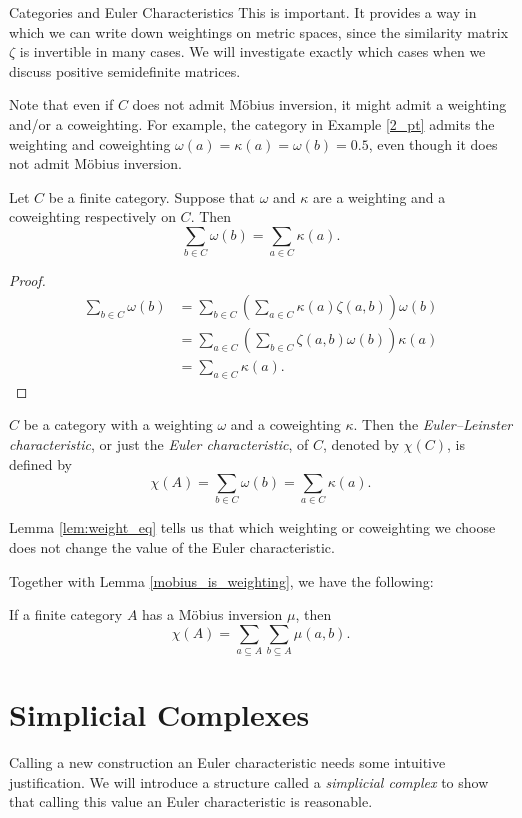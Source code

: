 \documentclass[12pt]{pom_thesis}
\begin{document}
\begin{chapter}{Categories and Euler Characteristics}
This is important. It provides a way in which we can write down weightings on metric spaces, since the similarity matrix $\zeta$ is invertible in many cases. We will investigate exactly which cases when we discuss positive semidefinite matrices.

Note that even if $C$ does not admit M\"obius inversion, it might admit a weighting and/or a coweighting. For example, the category in Example \ref{2_pt} admits the weighting and coweighting $\omega(a) =\kappa(a)= \omega(b) = 0.5$, even though it does not admit M\"obius inversion.

\begin{lemma}\label{lem:weight_eq}
Let $C$ be a finite category. Suppose that $\omega$ and $\kappa$ are a weighting and a coweighting respectively on $C$. Then 
\[\sum_{b \in C} \omega(b) = \sum_{a \in C} \kappa(a).
\]
\end{lemma}
\begin{proof}
\begin{align*}
\sum_{b \in C} \omega(b) &= \sum_{b \in C}\left( \sum_{a \in C} \kappa(a)\zeta(a,b)\right)\omega(b) \\
&= \sum_{a \in C}\left(\sum_{b \in C} \zeta(a,b)\omega(b)\right)  \kappa(a) \\
&= \sum_{a \in C}\kappa(a).
\end{align*}
\end{proof}

\begin{defn}\label{cat_euler}
$C$ be a category with a weighting $\omega$ and a coweighting $\kappa$. Then the \emph{Euler--Leinster characteristic}, or just the \emph{Euler characteristic}, of $C$, denoted by $\chi(C)$, is defined by
\[
\chi(A) = \sum_{b \in C} \omega(b) = \sum_{a \in C} \kappa(a).
\]
\end{defn}
Lemma \ref{lem:weight_eq} tells us that which weighting or coweighting we choose does not change the value of the Euler characteristic.

Together with Lemma \ref{mobius_is_weighting}, we have the following:
\begin{cor}\label{euler_mu}
If a finite category $A$ has a M\"obius inversion $\mu$, then
\[\chi(A) = \sum_{a \subseteq A} \sum_{b \subseteq A} \mu(a, b).
\]
\end{cor}
\section{Simplicial Complexes}
Calling a new construction an Euler characteristic needs some intuitive justification. We will introduce a structure called a \textit{simplicial complex} to show that calling this value an Euler characteristic is reasonable. 


\end{chapter}
\end{document}
